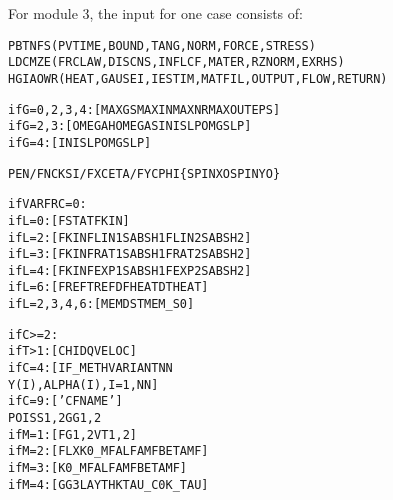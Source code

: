 \documentclass[12pt]{report}
\renewcommand{\magenta}[1]{}
\begin{document}
For module 3, the input for one case consists of:
\begin{alltt}\small
% Control integers, see section \ref{sec:controldigits}:

\magenta{ } PBTNFS      \magenta{        }       (PVTIME, BOUND , TANG  , NORM  , FORCE , STRESS)
\magenta{ } LDCMZE      \magenta{        }       (FRCLAW, DISCNS, INFLCF, MATER , RZNORM, EXRHS )
\magenta{X}HGIAOWR     (\magenta{XFLOW , }HEAT  , GAUSEI, IESTIM, MATFIL, OUTPUT, FLOW  , RETURN)

\magenta{% Parameters for additional debug output

if X=1:  [ PSFLRIN ] (PROFIL, SMOOTH, FORCE , LOCATE, READLN, INFLCF, NMDBG )

}% Parameters for the iterative solution algorithms (section \ref{sec:iter_const}):

if G=0,2,3,4: [ MAXGS   MAXIN   MAXNR   MAXOUT  EPS     ]
if G=2,3:     [ OMEGAH  OMEGAS  INISLP  OMGSLP          ]
if G=4:       [ INISLP  OMGSLP                          ]
\magenta{if G=5:       [ FDECAY  BETATH  KDOWFB  D\_IFC   D\_LIN   D\_CNS   D\_SLP   POW\_S ]
}
% Kinematics description (section \ref{sec:kincns}):
% Note: PEN  is needed when N=0,      FN when N=1
%       CKSI is needed when F=0,      FX when F=1 or 2
%       CETA is needed when F=0 or 1, FY when F=2

PEN/FN  CKSI/FX  CETA/FY  CPHI   \{SPINXO   SPINYO\}

% Friction description (section \ref{sec:fric_dscrp}):
%      L=0 --> Coulomb friction with static/kinetic coefficients
%      L=2 --> velocity dependent friction with linear/const formula
%      L=3 --> velocity dependent friction with rational formula
%      L=4 --> velocity dependent friction with exponential formula
%      L=6 --> temperature dependent friction with piecewise linear formula

if VARFRC=0:
      if L=0: [ FSTAT  FKIN                                ]
      if L=2: [ FKIN   FLIN1  SABSH1  FLIN2  SABSH2        ]
      if L=3: [ FKIN   FRAT1  SABSH1  FRAT2  SABSH2        ]
      if L=4: [ FKIN   FEXP1  SABSH1  FEXP2  SABSH2        ]
      if L=6: [ FREF   TREF   DFHEAT  DTHEAT               ]
if L=2,3,4,6: [ MEMDST MEM\_S0                              ]

% Information needed for influence coefficients,
% particularly the rolling direction and step size (section \ref{sec:kincns}),
% and the geometry/material configuration (section \ref{sec:matcns}):

if C>=2:\magenta{
      if T<=1 & M=5: [ DT                   ]}
      if T>1: [ CHI  DQ   VELOC             ]
      if C=4: [ IF\_METH   VARIANT   NN
                Y(I), ALPHA(I), I=1,NN      ]
      if C=9: [ 'CFNAME'                    ]
                POISS 1, 2   GG 1, 2
\magenta{      if B=1: [ FLXZ                        ]
}      if M=1: [ FG 1, 2   VT 1, 2           ]
      if M=2: [ FLX  K0\_MF   ALFAMF  BETAMF ]
      if M=3: [      K0\_MF   ALFAMF  BETAMF ]
      if M=4: [ GG3  LAYTHK  TAU\_C0  K\_TAU  ]


\end{alltt}
\end{document}
